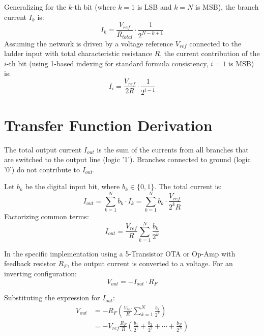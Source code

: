 \documentclass[conference]{IEEEtran}
\begin{document}
Generalizing for the $k$-th bit (where $k=1$ is LSB and $k=N$ is MSB), the branch current $I_k$ is:
\begin{equation}
    I_k = \frac{V_{ref}}{R_{total}} \cdot \frac{1}{2^{N-k+1}}
\end{equation}
Assuming the network is driven by a voltage reference $V_{ref}$ connected to the ladder input with total characteristic resistance $R$, the current contribution of the $i$-th bit (using 1-based indexing for standard formula consistency, $i=1$ is MSB) is:
\begin{equation}
    I_i = \frac{V_{ref}}{2R} \cdot \frac{1}{2^{i-1}}
\end{equation}

\section{Transfer Function Derivation}

The total output current $I_{out}$ is the sum of the currents from all branches that are switched to the output line (logic '1'). Branches connected to ground (logic '0') do not contribute to $I_{out}$.

Let $b_k$ be the digital input bit, where $b_k \in \{0, 1\}$. The total current is:
\begin{equation}
    I_{out} = \sum_{k=1}^{N} b_k \cdot I_k = \sum_{k=1}^{N} b_k \cdot \frac{V_{ref}}{2^k R}
\end{equation}
Factorizing common terms:
\begin{equation}
    I_{out} = \frac{V_{ref}}{R} \sum_{k=1}^{N} \frac{b_k}{2^k}
\end{equation}

In the specific implementation using a 5-Transistor OTA or Op-Amp with feedback resistor $R_F$, the output current is converted to a voltage. For an inverting configuration:
\begin{equation}
    V_{out} = - I_{out} \cdot R_F
\end{equation}

Substituting the expression for $I_{out}$:
\begin{equation}
\begin{aligned}
    V_{out} &= - R_F \left( \frac{V_{ref}}{R} \sum_{k=1}^{N} \frac{b_k}{2^k} \right) \\
            &= - V_{ref} \frac{R_F}{R} \left( \frac{b_1}{2^1} + \frac{b_2}{2^2} + \cdots + \frac{b_N}{2^N} \right)
\end{aligned}
\end{equation}
\end{document}
